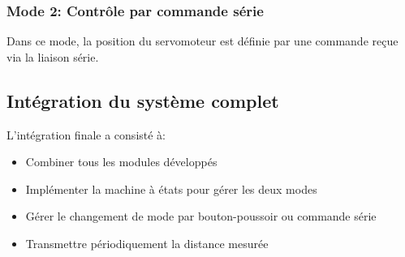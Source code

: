 \subsubsection{Mode 2: Contrôle par commande série}
Dans ce mode, la position du servomoteur est définie par une commande reçue via la liaison série.

\subsection{Intégration du système complet}
L'intégration finale a consisté à:
\begin{itemize}
    \item Combiner tous les modules développés
    \item Implémenter la machine à états pour gérer les deux modes
    \item Gérer le changement de mode par bouton-poussoir ou commande série
    \item Transmettre périodiquement la distance mesurée
\end{itemize}

